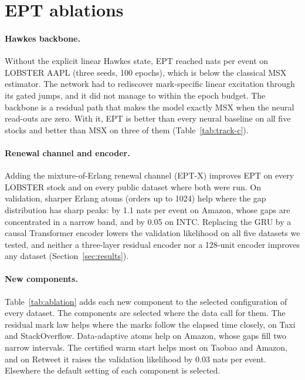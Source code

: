 \begin{table}[!htbp]\centering\small
\caption{Choice of the $\ell_1$ penalty on the news kernels. Held-out log-likelihood on the
2024 windows relative to the best level (bold), and the mean news-kernel mass of release and
placebo windows.}\label{tab:l1}

\end{table}

\section{EPT ablations}
\paragraph{Hawkes backbone.} Without the explicit linear Hawkes state, EPT reached
\eptNoBackbone{} nats per event on LOBSTER AAPL (three seeds, 100 epochs), which is below the
classical MSX estimator. The network had to rediscover mark-specific linear excitation through
its gated jumps, and it did not manage to within the epoch budget. The backbone is a residual
path that makes the model exactly MSX when the neural read-outs are zero. With it, EPT is better
than every neural baseline on all five stocks and better than MSX on three of them
(Table~\ref{tab:track-c}).

\paragraph{Renewal channel and encoder.} Adding the mixture-of-Erlang renewal channel (EPT-X)
improves EPT on every LOBSTER stock and on every public dataset where both were run. On
validation, sharper Erlang atoms (orders up to 1024) help where the gap distribution has sharp
peaks: by 1.1 nats per event on Amazon, whose gaps are concentrated in a narrow band, and by 0.05
on INTC. Replacing the GRU by a causal Transformer encoder \citep{vaswani2017attention} lowers the
validation likelihood on all five datasets we tested, and neither a three-layer residual encoder
nor a 128-unit encoder improves any dataset (Section~\ref{sec:results}).

\paragraph{New components.} Table~\ref{tab:ablation} adds each new component to the selected
configuration of every dataset. The components are selected where the data call for them. The
residual mark law helps where the marks follow the elapsed time closely, on Taxi and
StackOverflow. Data-adaptive atoms help on Amazon, whose gaps fill two narrow intervals. The
certified warm start helps most on Taobao and Amazon, and on Retweet it raises the validation
likelihood by 0.03 nats per event. Elsewhere the default setting of each component is selected.


